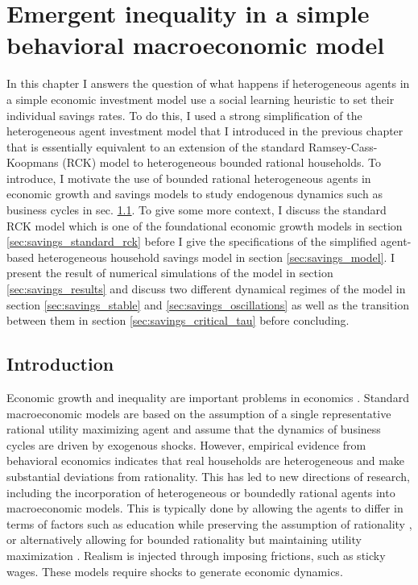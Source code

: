 \chapter{Emergent inequality in a simple behavioral macroeconomic model}
\label{chapter:savings}

In this chapter I answers the question of what happens if heterogeneous agents in a simple economic investment model use a social learning heuristic to set their individual savings rates. To do this, I used a strong simplification of the heterogeneous agent investment model that I introduced in the previous chapter that is essentially equivalent to an extension of the standard Ramsey-Cass-Koopmans (RCK) model to heterogeneous bounded rational households. To introduce, I motivate the use of bounded rational heterogeneous agents in economic growth and savings models to study endogenous dynamics such as business cycles in sec. \ref{sec:savings_introduction}. To give some more context, I discuss the standard RCK model which is one of the foundational economic growth models in section \ref{sec:savings_standard_rck} before I give the specifications of the simplified agent-based heterogeneous household savings model in section \ref{sec:savings_model}. I present the result of numerical simulations of the model in section \ref{sec:savings_results} and discuss two different dynamical regimes of the model in section \ref{sec:savings_stable} and \ref{sec:savings_oscillations} as well as the transition between them in section \ref{sec:savings_critical_tau} before concluding.

\section{Introduction}
\label{sec:savings_introduction}

Economic growth and inequality are important problems in economics \cite{Acemoglu2009, piketty2015capital}. Standard macroeconomic models are based on the assumption of a single representative rational utility maximizing agent and assume that the dynamics of business cycles are driven by exogenous shocks. However, empirical evidence from behavioral economics indicates that real households are heterogeneous and make substantial deviations from rationality.   This has led to new directions of research, including the incorporation of heterogeneous or boundedly rational agents into macroeconomic models. This is typically done by allowing the agents to differ in terms of factors such as education while preserving the assumption of rationality \cite{ hank_reviewLeahy2018, hank_branch2009new, hank_zhao2018many}, or alternatively allowing for bounded rationality but maintaining utility maximization \cite{hank_gabaix2016behavioral}.  Realism is injected through imposing frictions, such as sticky wages.  These models require shocks to generate economic dynamics.

